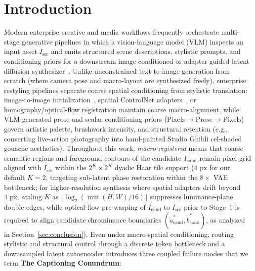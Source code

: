 \documentclass[conference,10pt]{IEEEtran}
\begin{document}
\section{Introduction}
\label{sec:intro}

Modern enterprise creative and media workflows frequently orchestrate multi-stage generative pipelines in which a vision-language model (VLM) inspects an input asset $I_{\text{src}}$ and emits structured scene descriptions, stylistic prompts, and conditioning priors for a downstream image-conditioned or adapter-guided latent diffusion synthesizer~\cite{rombach2022,team2025gemini,meng2022sdedit,zhang2023}. Unlike unconstrained text-to-image generation from scratch (where camera pose and macro-layout are synthesized freely), enterprise restyling pipelines separate coarse spatial conditioning from stylistic translation: image-to-image initialization~\cite{meng2022sdedit}, spatial ControlNet adapters~\cite{zhang2023}, or homography/optical-flow registration maintain coarse macro-alignment, while VLM-generated prose and scalar conditioning priors ($\text{Pixels} \to \text{Prose} \to \text{Pixels}$) govern artistic palette, brushwork intensity, and structural retention (e.g., converting live-action photography into hand-painted Studio Ghibli cel-shaded gouache aesthetics). Throughout this work, \emph{macro-registered} means that coarse semantic regions and foreground contours of the candidate $I_{\text{cand}}$ remain pixel-grid aligned with $I_{\text{src}}$ within the $2^K \times 2^K$ dyadic Haar tile support ($4\text{ px}$ for our default $K=2$, targeting sub-latent phase restoration within the $8\times$ VAE bottleneck; for higher-resolution synthesis where spatial adapters drift beyond $4\text{ px}$, scaling $K$ as $\lfloor \log_2(\min(H,W)/16) \rfloor$ suppresses luminance-plane double-edges, while optical-flow pre-warping of $I_{\text{cand}}$ to $I_{\text{src}}$ prior to Stage~1 is required to align candidate chrominance boundaries $(\widetilde{a}^*_{\text{cand}}, \widetilde{b}^*_{\text{cand}})$, as analyzed in Section~\ref{sec:conclusion}). Even under macro-spatial conditioning, routing stylistic and structural control through a discrete token bottleneck and a downsampled latent autoencoder introduces three coupled failure modes that we term \textbf{The Captioning Conundrum}:
\end{document}

